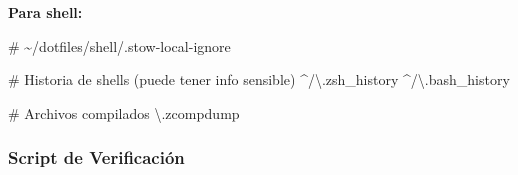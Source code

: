 \documentclass[
  doc,
  floatsintext,
  longtable,
  a4paper,
  nolmodern,
  notxfonts,
  notimes,
  12pt,
  colorlinks=true,linkcolor=blue,citecolor=blue,urlcolor=blue]{apa7}
\newenvironment{Shaded}{\begin{snugshade}}{\end{snugshade}}
\newcommand{\CommentTok}[1]{\textcolor[rgb]{0.37,0.37,0.37}{#1}}
\newcommand{\ExtensionTok}[1]{\textcolor[rgb]{0.00,0.23,0.31}{#1}}
\begin{document}
\textbf{Para shell:}

\begin{Shaded}
\begin{Highlighting}[]
\CommentTok{\# \textasciitilde{}/dotfiles/shell/.stow{-}local{-}ignore}

\CommentTok{\# Historia de shells (puede tener info sensible)}
\ExtensionTok{\^{}/\textbackslash{}.zsh\_history}
\ExtensionTok{\^{}/\textbackslash{}.bash\_history}

\CommentTok{\# Archivos compilados}
\ExtensionTok{\textbackslash{}.zcompdump}
\end{Highlighting}
\end{Shaded}

\subsubsection{Script de Verificación}\label{script-de-verificaciuxf3n}
\end{document}
